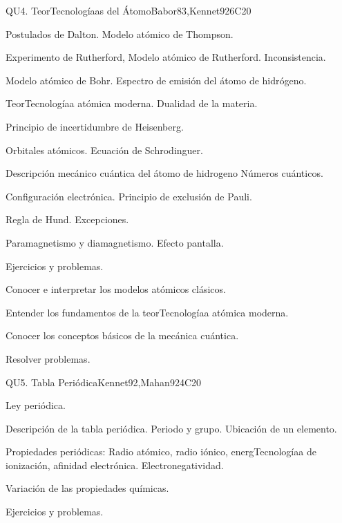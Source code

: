 \begin{syllabus}
\begin{unit}{QU4. TeorTecnologíaas del Átomo}{}{Babor83,Kennet92}{6}{C20}
\begin{topics}
      \item Postulados de Dalton. Modelo atómico de Thompson.
      \item Experimento de Rutherford, Modelo atómico de Rutherford. Inconsistencia.
      \item Modelo atómico de Bohr. Espectro de emisión del átomo de hidrógeno.
      \item TeorTecnologíaa atómica moderna. Dualidad de la materia.
      \item Principio de incertidumbre de Heisenberg.
      \item Orbitales atómicos. Ecuación de Schrodinguer.
      \item Descripción mecánico cuántica del átomo de hidrogeno Números cuánticos.
      \item Configuración electrónica. Principio de exclusión de Pauli.
      \item Regla de Hund. Excepciones.
      \item Paramagnetismo y diamagnetismo. Efecto pantalla.
      \item Ejercicios y problemas.
   \end{topics}

   \begin{learningoutcomes}
      \item Conocer e interpretar los modelos atómicos clásicos.
      \item Entender los fundamentos de la teorTecnologíaa atómica moderna.
      \item Conocer los conceptos básicos de la mecánica cuántica.
      \item Resolver problemas.
   \end{learningoutcomes}
\end{unit}

\begin{unit}{QU5. Tabla Periódica}{}{Kennet92,Mahan92}{4}{C20}
\begin{topics}
	\item Ley periódica.
	\item Descripción de la tabla periódica. Periodo y grupo. Ubicación de un elemento.
	\item Propiedades periódicas: Radio atómico, radio iónico, energTecnologíaa de ionización, afinidad electrónica. Electronegatividad.
	\item Variación de las propiedades químicas.
	\item Ejercicios y problemas.
   \end{topics}


\end{unit}
\end{syllabus}
